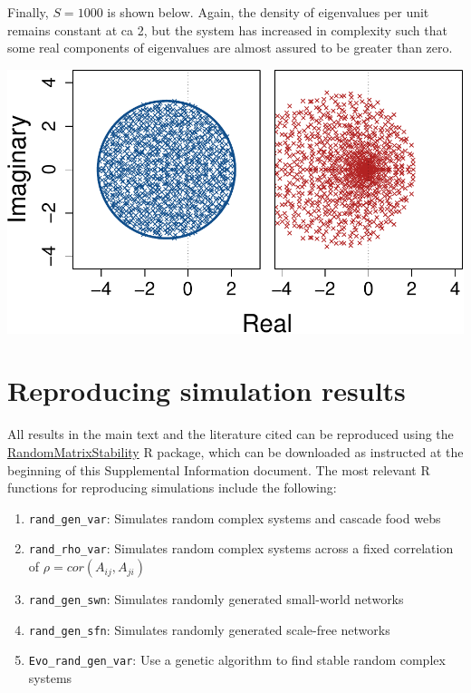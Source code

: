 \documentclass[]{article}
\providecommand{\tightlist}{%
  \setlength{\itemsep}{0pt}\setlength{\parskip}{0pt}}
\begin{document}
Finally, \(S = 1000\) is shown below. Again, the density of eigenvalues
per unit remains constant at ca 2, but the system has increased in
complexity such that some real components of eigenvalues are almost
assured to be greater than zero.

\includegraphics{unnamed-chunk-44-1.pdf}


\hypertarget{repr}{\section{Reproducing simulation results}\label{repr}}

All results in the main text and the literature cited can be reproduced
using the
\href{https://github.com/bradduthie/RandomMatrixStability}{RandomMatrixStability}
R package, which can be downloaded as instructed at the beginning of
this Supplemental Information document. The most relevant R functions
for reproducing simulations include the following:

\begin{enumerate}
\def\labelenumi{\arabic{enumi}.}
\tightlist
\item
  \texttt{rand\_gen\_var}: Simulates random complex systems and cascade
  food webs
\item
  \texttt{rand\_rho\_var}: Simulates random complex systems across a
  fixed correlation of \(\rho = cor(A_{ij}, A_{ji})\)
\item
  \texttt{rand\_gen\_swn}: Simulates randomly generated small-world
  networks
\item
  \texttt{rand\_gen\_sfn}: Simulates randomly generated scale-free
  networks
\item
  \texttt{Evo\_rand\_gen\_var}: Use a genetic algorithm to find stable
  random complex systems
\end{enumerate}
\end{document}
